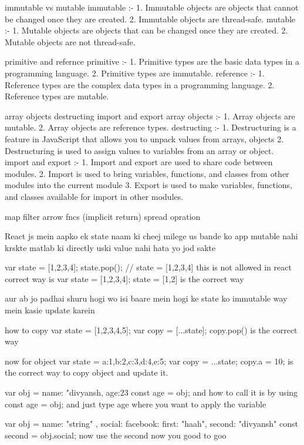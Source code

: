 immutable vs mutable
immutable :- 
1. Immutable objects are objects that cannot be changed once they are created.
2. Immutable objects are thread-safe.
mutable :-
1. Mutable objects are objects that can be changed once they are created.
2. Mutable objects are not thread-safe.

primitive and refernce 
primitive :-
1. Primitive types are the basic data types in a programming language.
2. Primitive types are immutable.
reference :-
1. Reference types are the complex data types in a programming language.
2. Reference types are mutable.

array objects destructing import and export 
array objects :-
1. Array objects are mutable.
2. Array objects are reference types.
destructing :-
1. Destructuring is a feature in JavaScript that allows you to unpack values from arrays, objects
2. Destructuring is used to assign values to variables from an array or object.
import and export :-
1. Import and export are used to share code between modules.
2. Import is used to bring variables, functions, and classes from other modules into the current module
3. Export is used to make variables, functions, and classes available for import in other modules.

map filter arrow fncs (implicit return) spread opration

React js mein aapko ek state naam ki cheej milege us bande ko app mutable nahi krskte matlab ki directly uski value nahi hata yo jod sakte 

var state = [1,2,3,4];
 state.pop(); // state = [1,2,3,4]
 this is not allowed in react 
 correct way is 
 var state = [1,2,3,4];
 state = [1,2] is the correct way

aur ab jo padhai shuru hogi wo isi baare mein hogi ke state ko immutable way mein kasie update karein 

how to copy 
var state = [1,2,3,4,5];
var copy = [...state];
copy.pop()
is the correct way

now for object 
var state = {a:1,b:2,c:3,d:4,e:5};
var copy = {...state};
copy.a = 10;
is the correct way to copy object and update it.

var obj = {name: "divyansh, age:23}
const {age} = obj;
and how to call it is by using 
const {age} = obj;
and just type age where you want to apply the variable

var obj = {name: "string" , social:{
    facebook: {
        first: "haah",
        second: "divyansh"
    }
}}
const {second} = obj.social;
now use the second now you good to goo 

